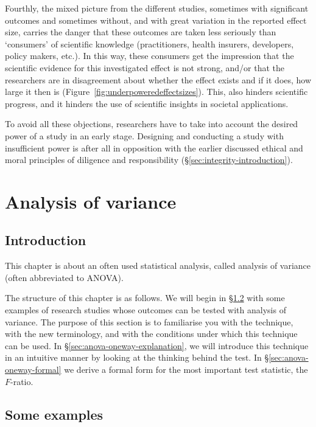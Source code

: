 \documentclass[
]{book}
\begin{document}
Fourthly, the mixed picture from the different studies, sometimes with significant
outcomes and sometimes without, and with great variation in the reported
effect size, carries the danger that these
outcomes are taken less seriously than `consumers' of
scientific knowledge (practitioners, health insurers, developers,
policy makers, etc.). In this way, these consumers get the impression
that the scientific evidence for this investigated effect is not strong,
and/or that the researchers are in disagreement about whether the effect exists
and if it does, how large it then is \citep{Kolf93} (Figure~\ref{fig:underpoweredeffectsizes}).
This, also hinders scientific progress, and it hinders the use
of scientific insights in societal applications.

To avoid all these objections, researchers have to take into account
the desired power of a study in an early stage. Designing and conducting
a study with insufficient power is after all in opposition with the earlier discussed
ethical and moral principles of diligence and responsibility
(§\ref{sec:integrity-introduction}).

\hypertarget{ch:anova}{%
\chapter{Analysis of variance}\label{ch:anova}}

\hypertarget{sec:introduction}{%
\section{Introduction}\label{sec:introduction}}

This chapter is about an often used statistical analysis, called
analysis of variance (often abbreviated to ANOVA).

The structure of this chapter is as follows. We will begin in §\ref{sec:anova-examples}
with some examples of research studies whose outcomes
can be tested with analysis of variance. The purpose of this section
is to familiarise you with the technique,
with the new terminology, and with the conditions under which this technique
can be used. In §\ref{sec:anova-oneway-explanation}, we will introduce this technique
in an intuitive manner by looking at the thinking behind the test. In
§\ref{sec:anova-oneway-formal} we derive a formal form for the most important
test statistic, the \(F\)-ratio.

\hypertarget{sec:anova-examples}{%
\section{Some examples}\label{sec:anova-examples}}
\end{document}
